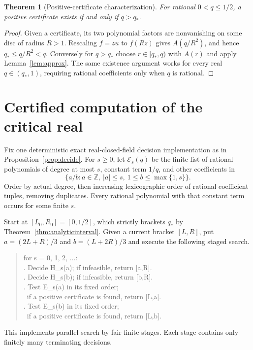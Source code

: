 \documentclass[11pt,a4paper]{article}
\newtheorem{theorem}{Theorem}[section]
\theoremstyle{definition}\newtheorem{definition}[theorem]{Definition}
\theoremstyle{remark}\newtheorem{remark}[theorem]{Remark}
\begin{document}
\begin{theorem}[Positive-certificate characterization]\label{thm:positive}
For rational $0<q\leq1/2$, a positive certificate exists if and only
if $q>q_*$.
\end{theorem}
\begin{proof}
Given a certificate, its two polynomial factors are nonvanishing on
some disc of radius $R>1$. Rescaling $f=zu$ to $f(Rz)$ gives
$A(q/R^2)$, and hence $q_*\leq q/R^2<q$.
Conversely for $q>q_*$ choose $r\in[q_*,q)$ with $A(r)$ and apply
Lemma~\ref{lem:approx}. The same existence argument works for every
real $q\in(q_*,1)$, requiring rational coefficients only when $q$ is
rational.
\end{proof}

\section{Certified computation of the critical real}\label{sec:algorithm}
Fix one deterministic exact real-closed-field decision implementation
as in Proposition~\ref{prop:decide}. For $s\geq0$, let $\mathcal E_s(q)$
be the finite list of rational polynomials of degree at most $s$, constant
term $1/q$, and other coefficients in
\[
 \{a/b:a\in\mathbb Z,\ |a|\leq s,\ 1\leq b\leq\max\{1,s\}\}.
\]
Order by actual degree, then increasing lexicographic order of rational
coefficient tuples, removing duplicates. Every rational polynomial
with that constant term occurs for some finite $s$.

Start at $[L_0,R_0]=[0,1/2]$, which strictly brackets $q_*$ by
Theorem~\ref{thm:analyticinterval}. Given a current bracket $[L,R]$, put
$a=(2L+R)/3$ and $b=(L+2R)/3$ and execute the following staged search.
\begin{quote}\ttfamily\small
for s = 0, 1, 2, ...:\\
. Decide H\_s(a); if infeasible, return [a,R].\\
. Decide H\_s(b); if infeasible, return [b,R].\\
. Test E\_s(a) in its fixed order;\\
\qquad\ if a positive certificate is found, return [L,a].\\
. Test E\_s(b) in its fixed order;\\
\qquad\ if a positive certificate is found, return [L,b].
\end{quote}
This implements parallel search by fair finite stages. Each stage
contains only finitely many terminating decisions.
\end{document}
